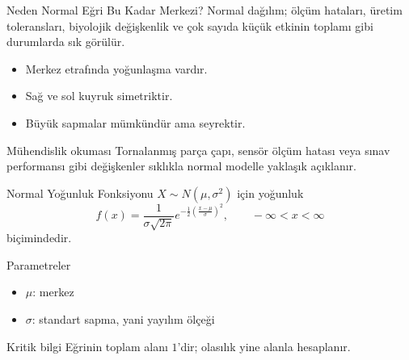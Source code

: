 \documentclass[light]{lutbeamer}
\begin{document}
\begin{frame}{Neden Normal Eğri Bu Kadar Merkezi?}
    \small
    Normal dağılım; ölçüm hataları, üretim toleransları, biyolojik değişkenlik ve çok sayıda küçük etkinin toplamı gibi durumlarda sık görülür.

    \begin{itemize}
        \item Merkez etrafında yoğunlaşma vardır.
        \item Sağ ve sol kuyruk simetriktir.
        \item Büyük sapmalar mümkündür ama seyrektir.
    \end{itemize}

    \begin{alertblock}{Mühendislik okuması}
        Tornalanmış parça çapı, sensör ölçüm hatası veya sınav performansı gibi değişkenler sıklıkla normal modelle yaklaşık açıklanır.
    \end{alertblock}
\end{frame}

\begin{frame}{Normal Yoğunluk Fonksiyonu}
    \small
    \(X \sim N(\mu,\sigma^2)\) için yoğunluk
    \[
    f(x)=\frac{1}{\sigma\sqrt{2\pi}}
    e^{-\frac{1}{2}\left(\frac{x-\mu}{\sigma}\right)^2},
    \qquad -\infty < x < \infty
    \]
    biçimindedir.

    \begin{block}{Parametreler}
        \begin{itemize}
            \item \(\mu\): merkez
            \item \(\sigma\): standart sapma, yani yayılım ölçeği
        \end{itemize}
    \end{block}

    \begin{alertblock}{Kritik bilgi}
        Eğrinin toplam alanı \(1\)'dir; olasılık yine alanla hesaplanır.
    \end{alertblock}
\end{frame}
\end{document}
